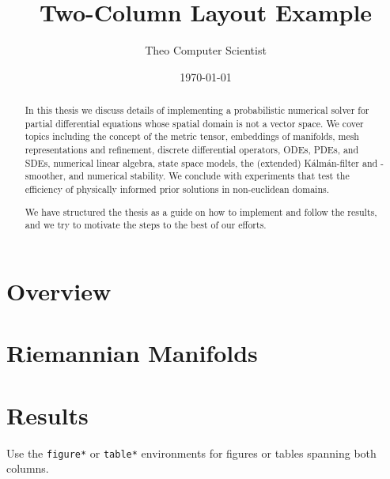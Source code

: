 
\def\COMPILINGFROMMAIN{}


\title{Two-Column Layout Example}
\author{Theo Computer Scientist}
\date{\today}
\maketitle

\begin{abstract}
In this thesis we discuss details of implementing a probabilistic numerical solver for partial differential equations whose spatial domain is not a vector space. We cover topics including the concept of the metric tensor, embeddings of manifolds, mesh representations and refinement, discrete differential operators, ODEs, PDEs, and SDEs, numerical linear algebra, state space models, the (extended) Kálmán-filter and -smoother, and numerical stability. We conclude with experiments that test the efficiency of physically informed prior solutions in non-euclidean domains.

We have structured the thesis as a guide on how to implement and follow the results, and we try to motivate the steps to the best of our efforts.
\end{abstract}

\section{Overview}


\section{Riemannian Manifolds}


\section{Results}
Use the \texttt{figure*} or \texttt{table*} environments for figures or tables spanning both columns.

